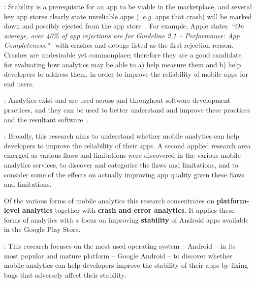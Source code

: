 : Stability is a prerequisite for an app to be viable in the marketplace, and several key app stores clearly state unreliable apps (~\emph{e.g.} apps that crash) will be marked down and possibly ejected from the app store~\citep{appleappstore2021_app_completeness, google_play_policy_center_broken_functionality, huaweidevelopers_appgallery_review_guidelines}. For example, Apple states~\emph{``On average, over 40\% of app rejections are for Guideline 2.1 – Performance: App Completeness."}~\citep{appleappstore2021_review_avoiding_common_app_rejections} with crashes and debugs listed as the first rejection reason. %
Crashes are undesirable yet commonplace; therefore they are a good candidate for evaluating how analytics may be able to a) help measure them and b) help developers to address them, in order to improve the reliability of mobile apps for end users.


: Analytics exist and are used across and throughout software development practices, and they can be used to better understand and improve these practices and the resultant software~\citep{buse_analytics_2010, buse2012_information_needs_for_software_development_analytics, menzies2018_unreasonable_effectiveness_of_software_analytics}.

: Broadly, this research aims to understand whether mobile analytics can help developers to improve the reliability of their apps. A second applied research area emerged as various flaws and limitations were discovered in the various mobile analytics services, to discover and categorise the flaws and limitations, and to consider some of the effects on actually improving app quality given these flaws and limitations.

Of the various forms of mobile analytics this research concentrates on \textbf{platform-level analytics} together with \textbf{crash and error analytics}. It applies these forms of analytics with a focus on improving \textbf{stability} of Android apps available in the Google Play Store.

: This research focuses on the most used operating system -- Android -- in its most popular and mature platform -- Google Android -- to discover whether mobile analytics can help developers improve the stability of their apps by fixing bugs that adversely affect their stability. 


